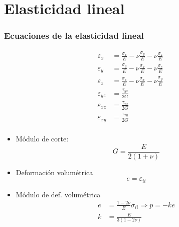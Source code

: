 \documentclass[10pt, aspectratio=43]{beamer}
\begin{document}
\section[Elasticidad]{Elasticidad lineal}

\begin{frame}
\frametitle{Ecuaciones de la elasticidad lineal}

\parbox{0.3\textwidth}{
\begin{align*}
\varepsilon_x&=\frac{\sigma_x}{E}-\nu \frac{\sigma_y}{E}-\nu \frac{\sigma_z}{E}
\\
\varepsilon_y&=\frac{\sigma_y}{E}-\nu \frac{\sigma_x}{E}-\nu \frac{\sigma_z}{E}
\\
\varepsilon_z&=\frac{\sigma_z}{E}-\nu \frac{\sigma_x}{E}-\nu \frac{\sigma_y}{E}
\\
\varepsilon_{yz}&=\frac{\tau_{yz}}{2G} \\
\varepsilon_{xz}&=\frac{\tau_{xz}}{2G} \\
\varepsilon_{xy}&=\frac{\tau_{xy}}{2G} \\
\end{align*}
}\parbox{0.6\textwidth}{
\begin{itemize}
\item Módulo de corte:
$$
G=\frac{E}{2(1+\nu)}
$$
\item Deformación volumétrica
$$
e=\varepsilon_{ii}
$$
\item Módulo de def. volumétrica
\begin{align*}
e&=\frac{1-2\nu}{E}\sigma_{ii} \Rightarrow p=-k e \\
k&=\frac{E}{3(1-2\nu)}
\end{align*}
\end{itemize}
}
\end{frame}
\end{document}
